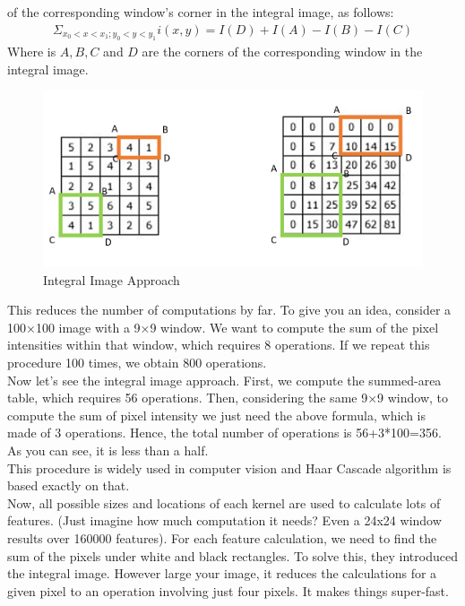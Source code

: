             of the corresponding window’s corner in the integral image, as follows:
            \begin{align}
                \Sigma_{x_0 < x < x_1; y_0 < y < y_1} i(x,y) = I(D) + I(A) - I(B) - I(C)
            \end{align}
            Where is $A,B,C$ and $D$ are the corners of the corresponding window in the integral image.
            \begin{figure}[H]
                \centering
                \includegraphics[width=0.6\linewidth]{img/corners_corresponding.png}
                \caption{Integral Image Approach}
            \end{figure}
            This reduces the number of computations by far. To give you an idea, consider a 100×100 image with a 9×9 window. We want to compute the sum of the pixel intensities within that window, which requires 8 operations. If we repeat this procedure 100 times, we obtain 800 operations. \\
            \vspace{3mm}
            Now let’s see the integral image approach. First, we compute the summed-area table, which requires 56 operations. Then, considering the same 9×9 window, to compute the sum of pixel intensity we just need the above formula, which is made of 3 operations. Hence, the total number 
            of operations is 56+3*100=356. As you can see, it is less than a half. \\
            \vspace{3mm}
            This procedure is widely used in computer vision and Haar Cascade algorithm is based exactly on that. \\
            \vspace{3mm}
            Now, all possible sizes and locations of each kernel are used to calculate lots of features. (Just imagine how much computation it needs? Even a 24x24 window results over 160000 features). For each feature calculation, we need to find the sum of the pixels under white 
            and black rectangles. To solve this, they introduced the integral image. However large your image, it reduces the calculations for a given pixel to an operation involving just four pixels. It makes things super-fast. \\ 
